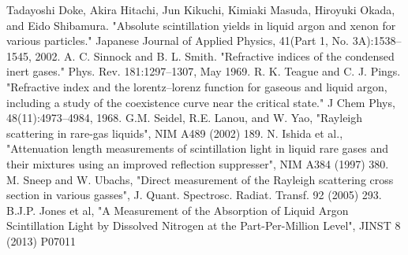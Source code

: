 \documentclass[12pt]{elsarticle}
\begin{document}
\begin{thebibliography}{99}
 Tadayoshi Doke, Akira Hitachi, Jun Kikuchi, Kimiaki Masuda, Hiroyuki Okada, and Eido Shibamura. "Absolute scintillation yields in liquid argon and xenon for various particles." Japanese Journal of Applied Physics, 41(Part 1, No. 3A):1538–1545, 2002.
 A. C. Sinnock and B. L. Smith. "Refractive indices of the condensed inert gases." Phys. Rev. 181:1297–1307, May 1969.   R. K. Teague and C. J. Pings. "Refractive index and the lorentz–lorenz function for gaseous and liquid argon, including a study of the coexistence curve near the critical state." J Chem Phys, 48(11):4973–4984, 1968.
 G.M. Seidel, R.E. Lanou, and W. Yao, "Rayleigh scattering in rare-gas liquids", NIM A489 (2002) 189.   N. Ishida et al., "Attenuation length measurements of scintillation light in liquid rare gases and their mixtures using an improved reflection suppresser", NIM A384 (1997) 380. M. Sneep and W. Ubachs, "Direct measurement of the Rayleigh scattering cross section in various gasses", J. Quant. Spectrosc. Radiat. Transf. 92 (2005) 293.
 B.J.P. Jones et al, "A Measurement of the Absorption of Liquid Argon Scintillation Light by Dissolved Nitrogen at the Part-Per-Million Level", JINST 8 (2013) P07011


\end{thebibliography}
\end{document}

